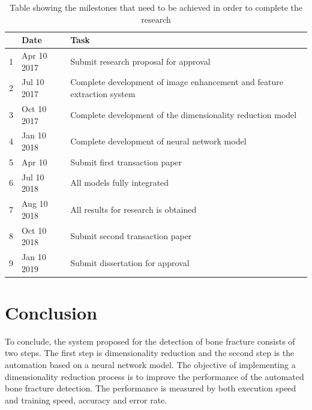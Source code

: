 \documentclass[11pt,twocolumn]{witseiepaper}
\begin{document}
	\newpage
	
	\begin{table}[!h]
		\centering
		\caption{Table showing the milestones that need to be achieved in order to complete the research}
		\label{tb: milestones}
		\begin{tabular}{| c | l | p{5cm} |}
			\hline 
			& Date & Task \\
			\hline \hline
			1 & Apr 10 2017 & Submit research proposal for approval\\
			\hline
			2 & Jul 10 2017 & Complete development of image enhancement and feature extraction system \\
			\hline
			3 & Oct 10 2017 & Complete development of the dimensionality reduction model \\
			\hline
			4 & Jan 10 2018 & Complete development of neural network model \\
			\hline
			5 & Apr 10 & Submit first transaction paper \\
			\hline
			6 & Jul 10 2018 & All models fully integrated \\
			\hline
			7 & Aug 10 2018 & All results for research is obtained \\
			\hline
			8 & Oct 10 2018 & Submit second transaction paper \\
			\hline
			9 & Jan 10 2019 & Submit dissertation for approval \\
			\hline
		\end{tabular}
	\end{table}
	
	\section{Conclusion}
	To conclude, the system proposed for the detection of bone fracture consists of two steps. The first step is dimensionality reduction and the second step is the automation based on a neural network model. The objective of implementing a dimensionality reduction process is to improve the performance of the automated bone fracture detection. The performance is measured by both execution speed and training speed, accuracy and error rate. 
	
	\newpage
	
	
	
\end{document}
